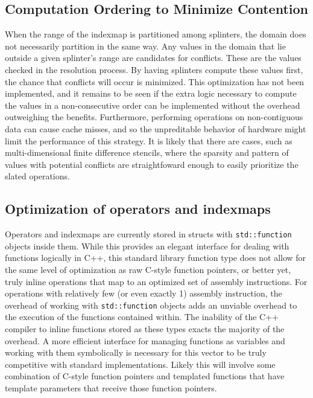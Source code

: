 \subsection{Computation Ordering to Minimize Contention}
When the range of the indexmap is partitioned among splinters, the domain does
not necessarily partition in the same way. Any values in the domain that lie
outside a given splinter's range are candidates for conflicts. These are the
values checked in the resolution process. By having splinters compute these
values first, the chance that conflicts will occur is minimized.
This optimization has not been implemented, and it remains to be seen if the
extra logic necessary to compute the values in a non-consecutive order can be
implemented without the overhead outweighing the benefits. Furthermore,
performing operations on non-contiguous data can cause cache misses, and so the
unpreditable behavior of hardware might limit the performance of this strategy.
It is likely that there are cases, such as multi-dimensional finite difference
stencils, where the sparsity and pattern of values with potential conflicts are
straightfoward enough to easily prioritize the slated operations.

\subsection{Optimization of operators and indexmaps}
Operators and indexmaps are currently stored in structs with
\texttt{std::function} objects inside them. While this provides an elegant
interface for dealing with functions logically in C++, this standard library
function type does not allow for the same level of optimization as raw C-style
function pointers, or better yet, truly inline operations that map to an
optimized set of assembly instructions. For operations with relatively few (or
even exactly 1) assembly instruction, the overhead of working with
\texttt{std::function} objects adds an unviable overhead to the execution of the
functions contained within. The inability of the C++ compiler to inline
functions stored as these types exacts the majority of the overhead. A more
efficient interface for managing functions as variables and working with them
symbolically is necessary for this vector to be truly competitive with standard
implementations. Likely this will involve some combination of C-style function
pointers and templated functions that have template parameters that receive
those function pointers.

